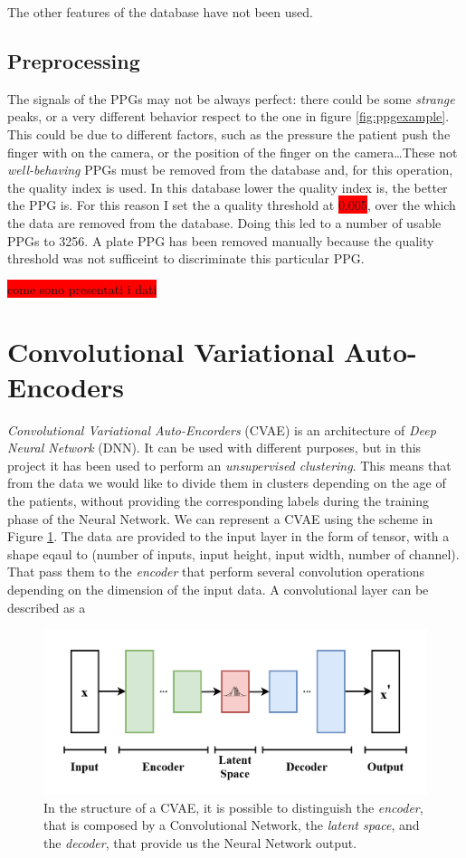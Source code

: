 \documentclass[12pt,a4paper,twocolumn]{article}
\begin{document}
			The other features of the database have not been used.
			\subsection{Preprocessing}
				The signals of the PPGs may not be always perfect: there could be some \emph{strange} peaks, or a very different behavior respect to the one in figure \ref{fig:ppgexample}.  This could be due to different factors, such as the pressure the patient push the finger with on the camera, or the position of the finger on the camera\dots These not \emph{well-behaving} PPGs must be removed from the database and, for this operation, the quality index is used. In this database lower the quality index is, the better the PPG is. For this reason I  set the a quality threshold at \colorbox{red}{0.005}, over the which the data are removed from the database. Doing this led to a number of usable PPGs to 3256. 
				A plate PPG has been removed manually because the quality threshold was not sufficeint to discriminate this particular PPG.
				
				\colorbox{red}{come sono presentati i dati}
		\section{Convolutional Variational Auto-Encoders}
			\label{vae_intro}
			\emph{Convolutional Variational Auto-Encorders} (CVAE) is an architecture of \emph{Deep Neural Network} (DNN). It can be used with different purposes, but in this project it has been used to perform an  \emph{unsupervised clustering}. This means that from the data we would like to divide them in clusters depending on the age of the patients, without providing the corresponding labels during the training phase of the Neural Network. 
			We can represent a CVAE using the scheme in Figure \ref{fig:vaebasic}. The data are provided to the input layer in the form of tensor, with a shape eqaul to (number of inputs, input height, input width, number of channel). That pass them to the \emph{encoder} that perform several convolution operations depending on the dimension of the input data. A convolutional layer can be described as a 
			\begin{figure}[h!] 
				\centering
				\includegraphics[width=1\linewidth]{images/VAE_Basic}
				\caption{In the structure of a CVAE, it is possible to distinguish the \emph{encoder}, that is composed by a Convolutional Network, the \emph{ latent space}, and the \emph{decoder}, that provide us the Neural Network output.}
				\label{fig:vaebasic}
			\end{figure}
		\newpage
		
		\printbibliography
\end{document}
